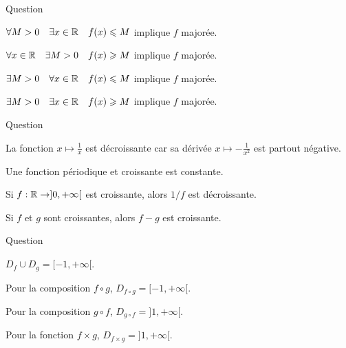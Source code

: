 \begin{multi}[multiple,feedback=
{Par définition \(f\) est majorée si \(\exists  M > 0 \quad \forall x \in \Rr \quad f(x) \le M\).
}]{Question}
    \item \(\forall  M > 0 \quad \exists x \in \mathbb{R} \quad f(x) \leqslant M\)  implique \(f\) majorée.
    \item \(\forall  x \in \mathbb{R} \quad \exists  M > 0 \quad f(x) \geqslant M\)  implique \(f\) majorée.
    \item* \(\exists  M > 0 \quad \forall x \in \Rr \quad f(x) \le M\)  implique \(f\) majorée.
    \item \(\exists  M > 0 \quad \exists x \in \mathbb{R} \quad f(x) \geqslant M\)  implique \(f\) majorée.
\end{multi}


\begin{multi}{Question}
    \item La fonction \(x \mapsto \frac{1}{x}\) est décroissante car sa dérivée \(x \mapsto -\frac{1}{x^2}\) est partout négative.
    \item* Une fonction périodique et croissante est constante.
    \item* Si \(f : \mathbb{R} \to ]0,+\infty[\) est croissante, alors \(1/f\) est décroissante.
    \item Si \(f\) et \(g\) sont croissantes, alors \(f-g\) est croissante.
\end{multi}


\begin{multi}[multiple,feedback=
{\(D_f = ]1,+\infty[\) ; \(D_g = [-1,+\infty[\) ; 
\(D_f \cup D_g = [-1,+\infty[\) ;
\(D_{f \times g} = D_f \cap D_g = ]1,+\infty[\) ;
\(D_{f \circ g} = ]1,+\infty[\).
\(g \circ f\) n'est pas définie pour \(x\) proche de \(1\), en fait 
\(D_{g\circ f} = [1+\frac1e,+\infty[\).
}]{Question}
    \item* \(D_f \cup D_g = [-1,+\infty[\).
    \item Pour la composition \(f \circ g\), \(D_{f\circ g} = [-1,+\infty[\).
    \item Pour la composition \(g \circ f\), \(D_{g\circ f} = ]1,+\infty[\).
    \item* Pour la fonction \(f \times g\), \(D_{f\times g} = ]1,+\infty[\).
\end{multi}


